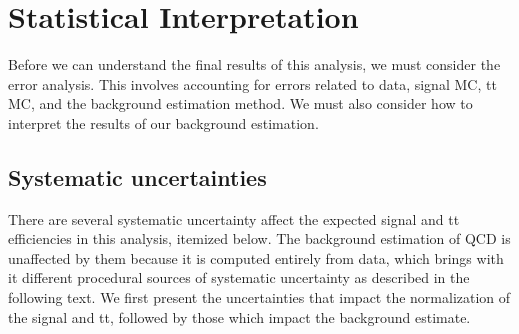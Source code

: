 \chapter{Statistical Interpretation}\label{Sec:Stat}

Before we can understand the final results of this analysis, we must consider the error analysis. This involves accounting for errors related to data, signal MC, tt MC, and the background estimation method. We must also consider how to interpret the results of our background estimation. 

\section{Systematic uncertainties\label{sec:Systematics}}

There are several systematic uncertainty affect the expected signal and tt efficiencies in this analysis, itemized below. The background estimation of QCD is unaffected by them because it is computed entirely from data, which brings with it different procedural sources of systematic uncertainty as described in the following text. We first present the uncertainties that impact the normalization of the signal and tt, followed by those which impact the background estimate.


